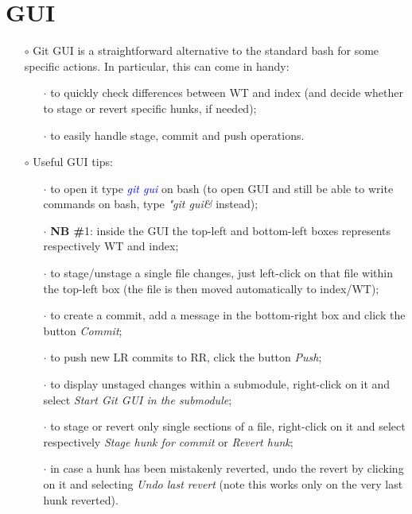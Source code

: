 \documentclass[a4paper,portrait,10pt]{article}   %
\newcommand{\mybulletlvA}{$\circ$}   %
\newcommand{\mybulletlvB}{$\cdot$}   %
\newcommand{\mycmd}[1]{\textcolor{blue}{\textit{#1}}}   %
\newcommand{\myvspace}{\vspace{4mm}}   %
\begin{document}

\section{GUI}   \label{sec:GUI}

\begin{itemize}
\item[\mybulletlvA] Git GUI is a straightforward alternative to the standard bash for some specific actions. In particular, this can come in handy:
\begin{itemize}
  \item[\mybulletlvB] to quickly check differences between WT and index (and decide whether to stage or revert specific hunks, if needed);
  \item[\mybulletlvB] to easily handle stage, commit and push operations.
\end{itemize}
\myvspace

\item[\mybulletlvA] Useful GUI tips:
\begin{itemize}
  \item[\mybulletlvB] to open it type \mycmd{git gui} on bash (to open GUI and still be able to write commands on bash, type \textit{"git gui\&} instead);
  \item[\mybulletlvB] \textbf{NB \#}1: inside the GUI the top-left and bottom-left boxes represents respectively WT and index;
  \item[\mybulletlvB] to stage/unstage a single file changes, just left-click on that file within the top-left box (the file is then moved automatically to index/WT);
  \item[\mybulletlvB] to create a commit, add a message in the bottom-right box and click the button \textit{Commit};
  \item[\mybulletlvB] to push new LR commits to RR, click the button \textit{Push};
  \item[\mybulletlvB] to display unstaged changes within a submodule, right-click on it and select \textit{Start Git GUI in the submodule};
  \item[\mybulletlvB] to stage or revert only single sections of a file, right-click on it and select respectively \textit{Stage hunk for commit} or \textit{Revert hunk};
  \item[\mybulletlvB] in case a hunk has been mistakenly reverted, undo the revert by clicking on it and selecting \textit{Undo last revert} (note this works only on the very last hunk reverted).
\end{itemize}
\end{itemize}
\myvspace
\end{document}
